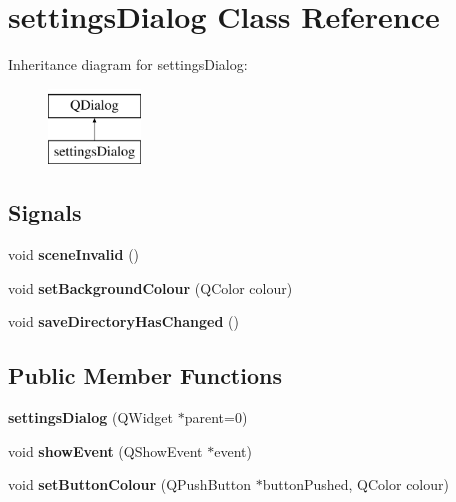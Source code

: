 \hypertarget{classsettings_dialog}{}\section{settings\+Dialog Class Reference}
\label{classsettings_dialog}
Inheritance diagram for settings\+Dialog\+:\begin{figure}[H]
\begin{center}
\leavevmode
\includegraphics[height=2.000000cm]{classsettings_dialog}
\end{center}
\end{figure}
\subsection*{Signals}
\begin{DoxyCompactItemize}
\item 
\mbox{\label{classsettings_dialog_afc5e121ba37f12221754a9e76172a82f}} 
void {\bfseries scene\+Invalid} ()
\item 
\mbox{\label{classsettings_dialog_a4b484584139b25437d8cb7218cf78a3c}} 
void {\bfseries set\+Background\+Colour} (Q\+Color colour)
\item 
\mbox{\label{classsettings_dialog_a2f3b6b8dc939f18ae86b54d8ef86da56}} 
void {\bfseries save\+Directory\+Has\+Changed} ()
\end{DoxyCompactItemize}
\subsection*{Public Member Functions}
\begin{DoxyCompactItemize}
\item 
\mbox{\label{classsettings_dialog_abe3d7f1c14fb45723918ae6bd0f999fa}} 
{\bfseries settings\+Dialog} (Q\+Widget $\ast$parent=0)
\item 
\mbox{\label{classsettings_dialog_a12dcaa04ce60f151ae7b77ce5ce2610d}} 
void {\bfseries show\+Event} (Q\+Show\+Event $\ast$event)
\item 
\mbox{\label{classsettings_dialog_a6f5b6ea59e6a2de876fee96f0a5501da}} 
void {\bfseries set\+Button\+Colour} (Q\+Push\+Button $\ast$button\+Pushed, Q\+Color colour)
\end{DoxyCompactItemize}


